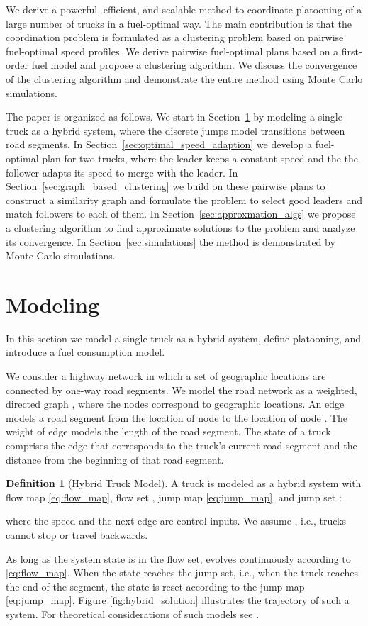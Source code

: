 \documentclass[letterpaper,10pt,conference,twocolumn]{IEEEtran}
\theoremstyle{definition}
\newtheorem{defi}{Definition}
\begin{document}
We derive a powerful, efficient, and scalable method to coordinate platooning of a large number of trucks in a fuel-optimal way. The main contribution is that the coordination problem is formulated as a clustering problem based on pairwise fuel-optimal speed profiles. We derive pairwise fuel-optimal plans based on a first-order fuel model and propose a clustering algorithm. We discuss the convergence of the clustering algorithm and demonstrate the entire method using Monte Carlo simulations. 

The paper is organized as follows. We start in Section~\ref{sec:modeling} by modeling a single truck as a hybrid system, where the discrete jumps model transitions between road segments. In Section~\ref{sec:optimal_speed_adaption} we develop a fuel-optimal plan for two trucks, where the leader keeps a constant speed and the the follower adapts its speed to merge with the leader. In Section~\ref{sec:graph_based_clustering} we build on these pairwise plans to construct a similarity graph and formulate the problem to select good leaders and match followers to each of them. In Section~\ref{sec:approxmation_algs} we propose a clustering algorithm to find approximate solutions to the problem and analyze its convergence. In Section~\ref{sec:simulations} the method is demonstrated by Monte Carlo simulations.

\section{Modeling}
\label{sec:modeling}

In this section we model a single truck as a hybrid system, define platooning, and introduce a fuel consumption model.

We consider a highway network in which a set of geographic locations are connected by one-way road segments.
We model the road network as a weighted, directed graph , where the nodes  correspond to geographic locations. An edge  models a road segment from the location of node  to the location of node . The weight  of edge  models the length of the road segment. The state of a truck  comprises the edge  that corresponds to the truck's current road segment and the distance  from the beginning of that road segment.


\begin{defi}[Hybrid Truck Model]\label{def:hybrid_truck_model}
A truck is modeled as a hybrid system with flow map \eqref{eq:flow_map}, flow set , jump map \eqref{eq:jump_map}, and jump set :

where the speed  and the next edge  are control inputs. We assume , i.e., trucks cannot stop or travel backwards.
\end{defi}
As long as the system state  is in the flow set,  evolves continuously according to \eqref{eq:flow_map}. When the state reaches the jump set, i.e., when the truck reaches the end of the segment, the state is reset according to the jump map \eqref{eq:jump_map}. Figure \ref{fig:hybrid_solution} illustrates the trajectory of such a system. For theoretical considerations of such models see \cite{hybridbook}.
\end{document}
